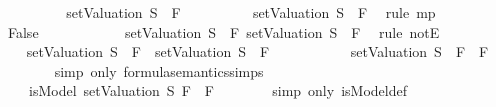 \begin{isabellebody}
\ \ \ \ \ \ \isamarkupfalse%
\ \isamarkupfalse%
\ {\isachardoublequoteopen}{\isacharparenleft}setValuation\ S{\isacharparenright}\ {\isasymTurnstile}\ F{}{\isachardoublequoteclose}\isanewline
\ \ \ \ \ \ \ \ \isamarkupfalse%
\ {\isacartoucheopen}{\isacharparenleft}setValuation\ S{\isacharparenright}\ {\isasymTurnstile}\ F{}{\isacartoucheclose}\ \isamarkupfalse%
\ {\isacharparenleft}rule\ mp{\isacharparenright}\isanewline
\ \ \ \ \ \ \isamarkupfalse%
\ {\isachardoublequoteopen}False{\isachardoublequoteclose}\ \isanewline
\ \ \ \ \ \ \ \ \isamarkupfalse%
\ {\isacartoucheopen}{\isasymnot}\ {\isacharparenleft}setValuation\ S{\isacharparenright}\ {\isasymTurnstile}\ F{}{\isacartoucheclose}\ {\isacartoucheopen}{\isacharparenleft}setValuation\ S{\isacharparenright}\ {\isasymTurnstile}\ F{}{\isacartoucheclose}\ \isamarkupfalse%
\ {\isacharparenleft}rule\ notE{\isacharparenright}\isanewline
\ \ \ \ \isamarkupfalse%
\isanewline
\ \ \ \ \isamarkupfalse%
\ \isamarkupfalse%
\ {\isachardoublequoteopen}{\isacharparenleft}{\isasymnot}\ {\isacharparenleft}{\isacharparenleft}setValuation\ S{\isacharparenright}\ {\isasymTurnstile}\ F{}\ {\isasymlongrightarrow}\ {\isacharparenleft}setValuation\ S{\isacharparenright}\ {\isasymTurnstile}\ F{}{\isacharparenright}{\isacharparenright}\ {\isacharequal}\ \isanewline
\ \ \ \ \ \ \ \ {\isacharparenleft}{\isasymnot}\ {\isacharparenleft}setValuation\ S{\isacharparenright}\ {\isasymTurnstile}\ {\isacharparenleft}F{}\ \isactrlbold {\isasymrightarrow}\ F{}{\isacharparenright}{\isacharparenright}{\isachardoublequoteclose}\isanewline
\ \ \ \ \ \ \isamarkupfalse%
\ {\isacharparenleft}simp\ only{\isacharcolon}\ formula{\isacharunderscore}semantics{\isachardot}simps{\isacharparenleft}{}{\isacharparenright}{\isacharparenright}\isanewline
\ \ \ \ \isamarkupfalse%
\ \isamarkupfalse%
\ {\isachardoublequoteopen}{\isasymdots}\ {\isacharequal}\ {\isacharparenleft}{\isasymnot}\ isModel\ {\isacharparenleft}setValuation\ S{\isacharparenright}\ {\isacharparenleft}F{}\ \isactrlbold {\isasymrightarrow}\ F{}{\isacharparenright}{\isacharparenright}{\isachardoublequoteclose}\isanewline
\ \ \ \ \ \ \isamarkupfalse%
\ {\isacharparenleft}simp\ only{\isacharcolon}\ isModel{\isacharunderscore}def{\isacharparenright}\isanewline

\end{isabellebody}
